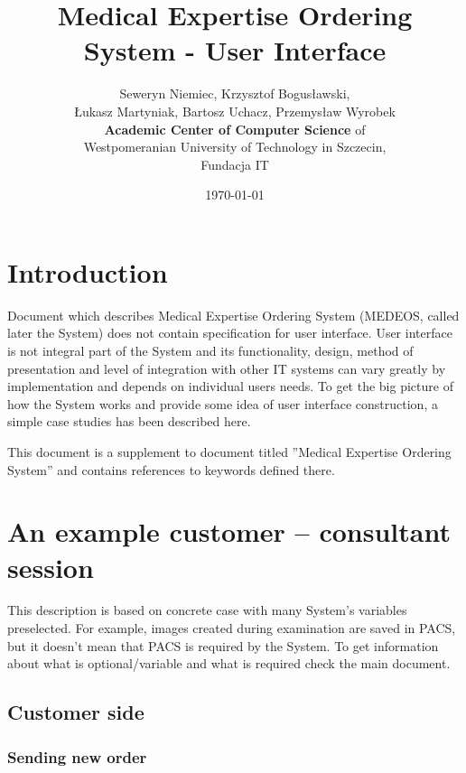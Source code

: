 \documentclass[a4paper]{article}
\begin{document}
\title{Medical Expertise Ordering System - User Interface}
\author{Seweryn Niemiec, Krzysztof Bogusławski,\\ 
Łukasz Martyniak, Bartosz Uchacz, Przemysław Wyrobek \\ 
\textbf{Academic Center of Computer Science } of \\ 
Westpomeranian University of Technology in Szczecin,\\
Fundacja IT}
\date{\today}
\maketitle
\tableofcontents

\section{Introduction}

Document which describes Medical Expertise Ordering System (MEDEOS, called later the
System) does not contain specification for user interface. User interface is not integral
part of the System and its functionality, design, method of presentation and level of
integration with other IT systems can vary greatly by implementation and depends on
individual users needs. To get the big picture of how the System works and provide some
idea of user interface construction, a simple case studies has been described here.

This document is a supplement to document titled ''Medical Expertise Ordering System''
and contains references to keywords defined there.

\section{An example customer -- consultant session}

This description is based on concrete case with many System's variables preselected. For
example, images created during examination are saved in PACS, but it doesn't mean that
PACS is required by the System. To get information about what is optional/variable and
what is required check the main document.

\subsection{Customer side}

\subsubsection{Sending new order}
\end{document}
